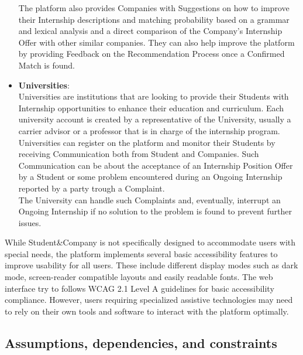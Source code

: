 \begin{itemize}
    The platform also provides Companies with Suggestions on how to improve their Internship descriptions and matching probability based on a grammar and lexical analysis and a direct comparison of the Company's Internship Offer with other similar companies. They can also help improve the platform by providing Feedback on the Recommendation Process once a Confirmed Match is found.
  \item \textbf{Universities}:\\
    Universities are institutions that are looking to provide their Students with Internship opportunities to enhance their education and curriculum. Each university account is created by a representative of the University, usually a carrier advisor or a professor that is in charge of the internship program.\\
    Universities can register on the platform and monitor their Students by receiving Communication both from Student and Companies. Such Communication can be about the acceptance of an Internship Position Offer by a Student or some problem encountered during an Ongoing Internship reported by a party trough a Complaint. \\
    The University can handle such Complaints and, eventually, interrupt an Ongoing Internship if no solution to the problem is found to prevent further issues.
\end{itemize}
While Student\&Company is not specifically designed to accommodate users with special needs, the platform implements several basic accessibility features to improve usability for all users. These include different display modes such as dark mode, screen-reader compatible layouts and easily readable fonts.
The web interface try to follows WCAG 2.1 Level A guidelines for basic accessibility compliance. However, users requiring specialized assistive technologies may need to rely on their own tools and software to interact with the platform optimally.

\subsection{Assumptions, dependencies, and constraints}

